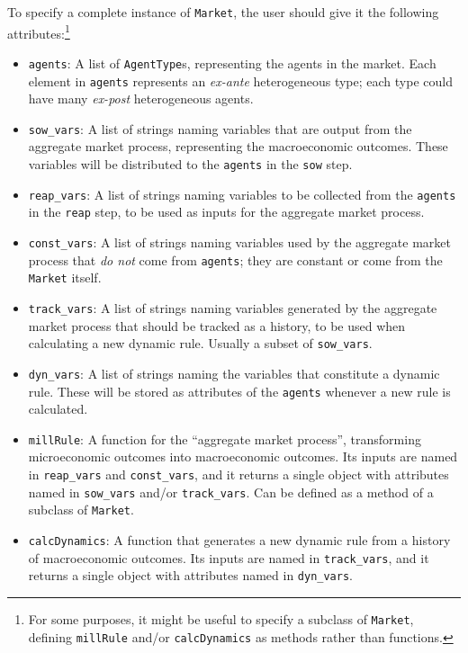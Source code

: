 \documentclass[12pt,titlepage,letterpaper]{econtex}
\begin{document}
{To specify a complete instance of \texttt{Market}, the user should give it the following attributes:\footnote{For some purposes, it might be useful to specify a subclass of \texttt{Market}, defining \texttt{millRule} and/or \texttt{calcDynamics} as methods rather than functions.}
\begin{itemize}
\item \texttt{agents}: A list of \texttt{AgentType}s, representing the agents in the market.  Each element in \texttt{agents} represents an \textit{ex-ante} heterogeneous type; each type could have many \textit{ex-post} heterogeneous agents.

\item \texttt{sow\_vars}: A list of strings naming variables that are output from the aggregate market process, representing the macroeconomic outcomes.  These variables will be distributed to the \texttt{agents} in the \texttt{sow} step.

\item \texttt{reap\_vars}: A list of strings naming variables to be collected from the \texttt{agents} in the \texttt{reap} step, to be used as inputs for the aggregate market process.

\item \texttt{const\_vars}: A list of strings naming variables used by the aggregate market process that \textit{do not} come from \texttt{agents}; they are constant or come from the \texttt{Market} itself.

\item \texttt{track\_vars}: A list of strings naming variables generated by the aggregate market process that should be tracked as a history, to be used when calculating a new dynamic rule.  Usually a subset of \texttt{sow\_vars}.

\item \texttt{dyn\_vars}: A list of strings naming the variables that constitute a dynamic rule.  These will be stored as attributes of the \texttt{agents} whenever a new rule is calculated.

\item \texttt{millRule}: A function for the ``aggregate market process'', transforming microeconomic outcomes into macroeconomic outcomes.  Its inputs are named in \texttt{reap\_vars} and \texttt{const\_vars}, and it returns a single object with attributes named in \texttt{sow\_vars} and/or \texttt{track\_vars}.  Can be defined as a method of a subclass of \texttt{Market}.

\item \texttt{calcDynamics}: A function that generates a new dynamic rule from a history of macroeconomic outcomes.  Its inputs are named in \texttt{track\_vars}, and it returns a single object with attributes named in \texttt{dyn\_vars}.


\end{itemize}}
\end{document}
